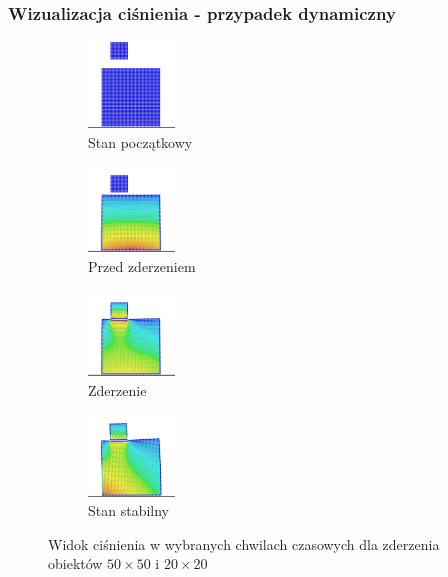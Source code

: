 \documentclass{beamer}
\begin{document}
\begin{frame}
    \frametitle{Wizualizacja ciśnienia - przypadek dynamiczny}

    \begin{figure}[h]
        \begin{subfigure}{0.4\textwidth}
            \centering
            \includegraphics[width=2.3cm]{pressure02_01} 
            \caption{Stan początkowy}
        \end{subfigure}
        \begin{subfigure}{0.4\textwidth}
            \centering
            \includegraphics[width=2.3cm]{pressure02_02}
            \caption{Przed zderzeniem}
        \end{subfigure}
        \begin{subfigure}{0.4\textwidth}
            \centering
            \includegraphics[width=2.3cm]{pressure02_03}
            \caption{Zderzenie}
        \end{subfigure}
        \begin{subfigure}{0.4\textwidth}
            \centering
            \includegraphics[width=2.3cm]{pressure02_04}
            \caption{Stan stabilny}
        \end{subfigure}
        
        \caption{Widok ciśnienia w wybranych chwilach czasowych dla zderzenia obiektów $50 \times 50$ i $20 \times 20$}
    \end{figure}

\end{frame}
\end{document}
